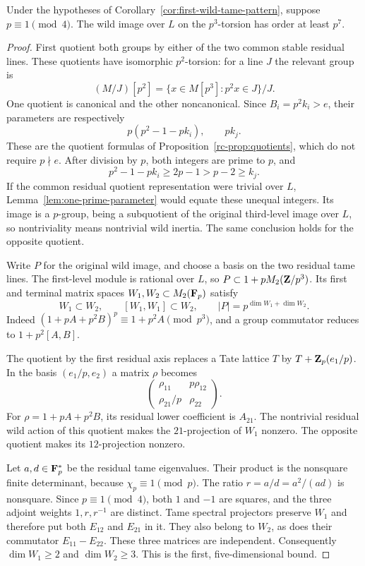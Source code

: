 \begin{proposition}\label{prop:opposite-quotient-image}
Under the hypotheses of Corollary~\ref{cor:first-wild-tame-pattern}, suppose $p\equiv1\pmod4$. The wild image over $L$ on the $p^3$-torsion has order at least $p^7$.
\end{proposition}
\begin{proof}

First quotient both groups by either of the two common stable residual lines. These quotients have isomorphic $p^2$-torsion: for a line $J$ the relevant group is
\[
 (M/J)[p^2]=\{x\in M[p^3]:p^2x\in J\}/J.
\]
One quotient is canonical and the other noncanonical. Since $B_i=p^2k_i>e$, their parameters are respectively
\[
       p(p^2-1-pk_i),\qquad pk_j.
\]
These are the quotient formulas of Proposition~\ref{rc-prop:quotients}, which do not require $p\nmid e$. After division by $p$, both integers are prime to $p$, and
\[
               p^2-1-pk_i\ge2p-1>p-2\ge k_j.
\]
If the common residual quotient representation were trivial over $L$, Lemma~\ref{lem:one-prime-parameter} would equate these unequal integers. Its image is a $p$-group, being a subquotient of the original third-level image over $L$, so nontriviality means nontrivial wild inertia. The same conclusion holds for the opposite quotient.

Write $P$ for the original wild image, and choose a basis on the two residual tame lines. The first-level module is rational over $L$, so $P\subset1+pM_2(\mathbf Z/p^3)$. Its first and terminal matrix spaces $W_1,W_2\subset M_2(\mathbf F_p)$ satisfy
\[
 W_1\subset W_2,\qquad[W_1,W_1]\subset W_2,
 \qquad |P|=p^{\dim W_1+\dim W_2}.
\]
Indeed $(1+pA+p^2B)^p\equiv1+p^2A\pmod{p^3}$, and a group commutator reduces to $1+p^2[A,B]$.

The quotient by the first residual axis replaces a Tate lattice $T$ by $T+\mathbf Z_p(e_1/p)$. In the basis $(e_1/p,e_2)$ a matrix $\rho$ becomes
\[
 \begin{pmatrix}\rho_{11}&p\rho_{12}\\
                 \rho_{21}/p&\rho_{22}\end{pmatrix}.
\]
For $\rho=1+pA+p^2B$, its residual lower coefficient is $A_{21}$. The nontrivial residual wild action of this quotient makes the $21$-projection of $W_1$ nonzero. The opposite quotient makes its $12$-projection nonzero.

Let $a,d\in\mathbf F_p^*$ be the residual tame eigenvalues. Their product is the nonsquare finite determinant, because $\chi_p\equiv1\pmod p$. The ratio $r=a/d=a^2/(ad)$ is nonsquare. Since $p\equiv1\pmod4$, both $1$ and $-1$ are squares, and the three adjoint weights $1,r,r^{-1}$ are distinct. Tame spectral projectors preserve $W_1$ and therefore put both $E_{12}$ and $E_{21}$ in it. They also belong to $W_2$, as does their commutator $E_{11}-E_{22}$. These three matrices are independent. Consequently $\dim W_1\ge2$ and $\dim W_2\ge3$. This is the first, five-dimensional bound.


\end{proof}
